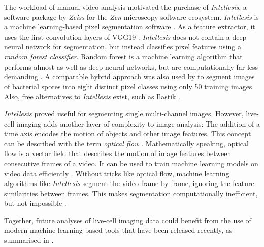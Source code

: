 The workload of manual video analysis motivated the purchase of
\textit{Intellesis}, a software package by \textit{Zeiss} for the \textit{Zen}
microscopy software ecosystem. \textit{Intellesis} is a machine learning-based
pixel segmentation software \cite{ZeissOADFeature}. As a feature
extractor\footterm{\footimagefeatures}{\label{foot:image_features}}, it uses the first
convolution layers of VGG19  \cite{simonyanVeryDeepConvolutional2015}.
\textit{Intellesis} does not contain a deep neural network for segmentation, but
instead classifies pixel features using a \emph{random forest classifier}.
Random forest is a machine learning algorithm that  performs almost as well as deep neural networks, but
are computationally far less demanding \cite{breimanRandomForests2001,
    richardsonDenseNeuralNetwork2023}. A comparable hybrid approach was also used by
\citet{qamarHybridCNNRandomForest2023} to segment images of bacterial spores
into eight distinct pixel classes using only 50 training images. Also, free
alternatives to \textit{Intellesis} exist, such as Ilastik
\cite{bergIlastikInteractiveMachine2019}.

\textit{Intellesis} proved useful for segmenting single multi-channel images.
However, live-cell imaging adds another layer of complexity to image analysis:
The addition of a time axis encodes the motion of objects and other image
features. This concept can be described with the term \emph{optical flow}
\cite{niehorsterOpticFlowHistory2021}. Mathematically speaking, optical flow is
a vector field that describes the motion of image
features between consecutive frames of a video. It
can be used to train machine learning models on video data efficiently
\cite{robitailleSelfsupervisedMachineLearning2022}. Without tricks like optical
flow, machine learning algorithms like \textit{Intellesis} segment the video
frame by frame, ignoring the feature similarities between frames. This makes
segmentation computationally inefficient, but not impossible
\cite{pylvanainenLivecellImagingDeep2023}.

Together, future analyses of live-cell imaging data could  benefit
from the use of modern machine learning based tools that have been released
recently, as summarised in \citet{pylvanainenLivecellImagingDeep2023}.




